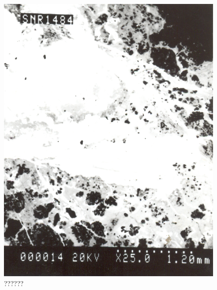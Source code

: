 \newpage

\begin{figure}[H]
\renewcommand{\thefigure}{25B}
\includegraphics[scale=0.65]{images/chapter-4/fig025B.jpg}
\caption{??????}\label{chapter-4-fig25B}
\end{figure}

